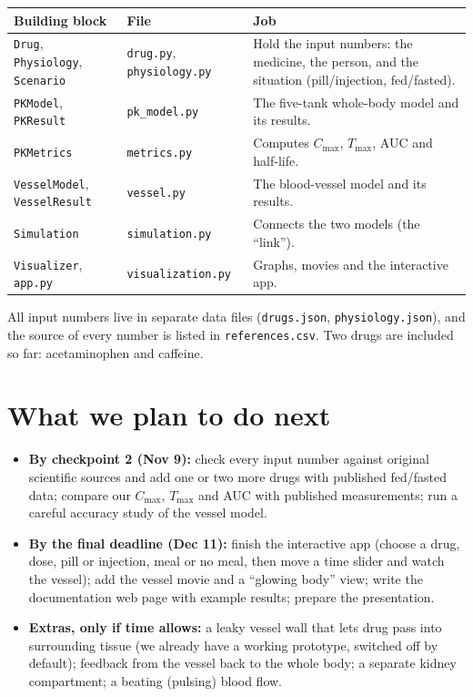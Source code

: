 \documentclass[10.5pt]{article}
\begin{document}
\begin{center}\small
\begin{tabularx}{\linewidth}{@{}l l X@{}}
\toprule
\textbf{Building block} & \textbf{File} & \textbf{Job}\\\midrule
\texttt{Drug}, \texttt{Physiology}, \texttt{Scenario} & \texttt{drug.py}, \texttt{physiology.py} & Hold the input numbers: the medicine, the person, and the situation (pill/injection, fed/fasted).\\
\texttt{PKModel}, \texttt{PKResult} & \texttt{pk\_model.py} & The five-tank whole-body model and its results.\\
\texttt{PKMetrics} & \texttt{metrics.py} & Computes $C_{\max}$, $T_{\max}$, AUC and half-life.\\
\texttt{VesselModel}, \texttt{VesselResult} & \texttt{vessel.py} & The blood-vessel model and its results.\\
\texttt{Simulation} & \texttt{simulation.py} & Connects the two models (the ``link'').\\
\texttt{Visualizer}, \texttt{app.py} & \texttt{visualization.py} & Graphs, movies and the interactive app.\\
\bottomrule
\end{tabularx}
\end{center}
All input numbers live in separate data files (\texttt{drugs.json}, \texttt{physiology.json}), and the source of
every number is listed in \texttt{references.csv}. Two drugs are included so far: acetaminophen and caffeine.

\section{What we plan to do next}
\begin{itemize}
\item \textbf{By checkpoint 2 (Nov 9):} check every input number against original scientific sources and add one or
two more drugs with published fed/fasted data; compare our $C_{\max}$, $T_{\max}$ and AUC with published measurements;
run a careful accuracy study of the vessel model.
\item \textbf{By the final deadline (Dec 11):} finish the interactive app (choose a drug, dose, pill or injection, meal or
no meal, then move a time slider and watch the vessel); add the vessel movie and a ``glowing body'' view; write the
documentation web page with example results; prepare the presentation.
\item \textbf{Extras, only if time allows:} a leaky vessel wall that lets drug pass into surrounding tissue (we already
have a working prototype, switched off by default); feedback from the vessel back to the whole body; a separate kidney
compartment; a beating (pulsing) blood flow.
\end{itemize}
\end{document}
